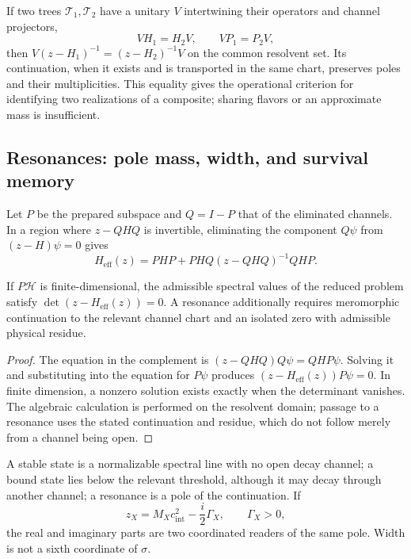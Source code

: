 If two trees \(\mathcal T_1,\mathcal T_2\) have a unitary
\(V\) intertwining their operators and channel projectors,
\[
 VH_1=H_2V,\qquad VP_1=P_2V,
\]
then \(V(z-H_1)^{-1}=(z-H_2)^{-1}V\) on the common resolvent set.
Its continuation, when it exists and is transported in the same chart,
preserves poles and their multiplicities. This equality gives the
operational criterion for identifying two realizations of a composite; sharing
flavors or an approximate mass is insufficient.

\subsection{Resonances: pole mass, width, and survival memory}
\label{vi:subsec:resonancias-familias}

Let \(P\) be the prepared subspace and \(Q=I-P\) that of the
eliminated channels. In a region where \(z-QHQ\) is invertible, eliminating
the component \(Q\psi\) from \((z-H)\psi=0\) gives
\begin{equation}
 H_{\mathrm{eff}}(z)=PHP+PHQ(z-QHQ)^{-1}QHP.
 \label{vi:eq:feshbach-familias}
\end{equation}

\begin{proposition}
\label{vi:prop:feshbach-familias}
If \(P\mathcal H\) is finite-dimensional, the admissible spectral
values of the reduced problem satisfy
\(\det(z-H_{\mathrm{eff}}(z))=0\). A resonance additionally requires
meromorphic continuation to the relevant channel chart and an isolated
zero with admissible physical residue.
\end{proposition}
\begin{proof}
The equation in the complement is
\((z-QHQ)Q\psi=QHP\psi\). Solving it and substituting into the equation
for \(P\psi\) produces \((z-H_{\mathrm{eff}}(z))P\psi=0\).
In finite dimension, a nonzero solution exists exactly when
the determinant vanishes. The algebraic calculation is performed on the resolvent
domain; passage to a resonance uses the stated continuation and
residue, which do not follow merely from a channel being open.
\end{proof}

A stable state is a normalizable spectral line with no open decay
channel; a bound state lies below the relevant threshold,
although it may decay through another channel; a resonance is a
pole of the continuation. If
\[
 z_X=M_Xc_{\mathrm{int}}^2-\frac{i}{2}\Gamma_X,
 \qquad\Gamma_X>0,
\]
the real and imaginary parts are two coordinated readers of the same
pole. Width is not a sixth coordinate of \(\sigma\).

